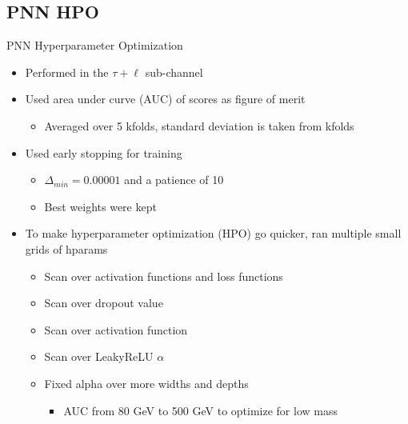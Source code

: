 \documentclass[aspectratio=169,xcolor=table]{beamer}
\begin{document}
  \subsection{PNN HPO}

    \begin{frame}[t]{PNN Hyperparameter Optimization}
      \begin{itemize}
        \item Performed in the $\tau+\ell$ sub-channel
        \item Used area under curve (AUC) of scores as figure of merit
        \begin{itemize}
          \item Averaged over 5 kfolds, standard deviation is taken from kfolds
        \end{itemize}
          \item Used early stopping for training
          \begin{itemize}
            \item $\Delta_{min}=0.00001$ and a patience of 10
            \item Best weights were kept
          \end{itemize}
        \item To make hyperparameter optimization (HPO) go quicker, ran multiple small grids of hparams
        \begin{itemize}
          \item Scan over activation functions and loss functions
          \item Scan over dropout value
          \item Scan over activation function
          \item Scan over LeakyReLU $\alpha$
          \item Fixed alpha over more widths and depths
          \begin{itemize}
            \item AUC from 80 GeV to 500 GeV to optimize for low mass
          \end{itemize}
        \end{itemize}
      \end{itemize}
    \end{frame}
\end{document}
